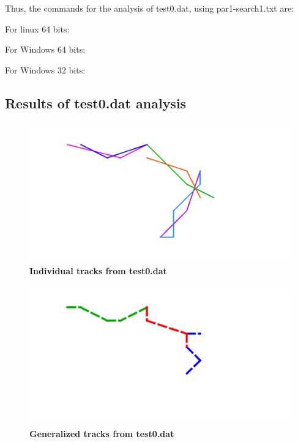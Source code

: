 Thus, the commands for the analysis of test0.dat, using par1-search1.txt are:

For linux 64 bits:


% 
% 


For Windows 64 bits:


 
 For Windows 32 bits:
 
 


\subsection{Results of test0.dat analysis}


\begin{figure}[!ht]
\begin{center}
 \includegraphics[scale=0.5]{./graphics/mst.png}
\end{center}
\caption{{\bf Individual tracks from test0.dat}}
\label{Figure1}
\end{figure}


\begin{figure}[!ht]
\begin{center}
 \includegraphics[scale=0.5]{./graphics/gtrack.png}
\end{center}
\caption{{\bf Generalized tracks from test0.dat}}
\label{Figure2}
\end{figure}

